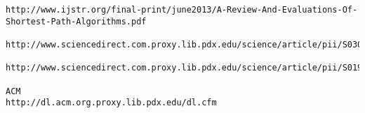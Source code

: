 \documentclass{article}
\begin{document}
\begin{verbatim}
http://www.ijstr.org/final-print/june2013/A-Review-And-Evaluations-Of-Shortest-Path-Algorithms.pdf

http://www.sciencedirect.com.proxy.lib.pdx.edu/science/article/pii/S0304397502006138#

http://www.sciencedirect.com.proxy.lib.pdx.edu/science/article/pii/S0196677403000464

ACM
http://dl.acm.org.proxy.lib.pdx.edu/dl.cfm
\end{verbatim}
\end{document}
